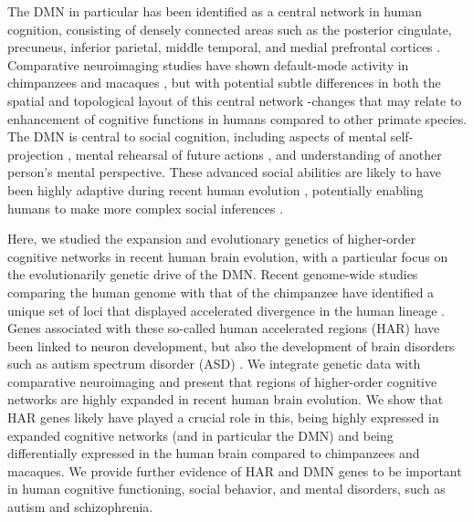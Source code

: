\begin{refsection}
The DMN in particular has been identified as a central network in human cognition, consisting of densely connected areas such as the posterior cingulate, precuneus, inferior parietal, middle temporal, and medial prefrontal cortices \citep{buckner2008brain,raichle2015brain}. Comparative neuroimaging studies have shown default-mode activity in chimpanzees \citep{barks2013default} and macaques \citep{mantini2011default}, but with potential subtle differences in both the spatial and topological layout of this central network \citep{miranda2014bridging}-changes that may relate to enhancement of cognitive functions in humans compared to other primate species. The DMN is central to social cognition, including aspects of mental self-projection \citep{buckner2007self}, mental rehearsal of future actions \citep{tulving2005episodic}, and understanding of another person’s mental perspective. These advanced social abilities are likely to have been highly adaptive during recent human evolution \citep{tomasello2010ape}, potentially enabling humans to make more complex social inferences \citep{buckner2007self}.

Here, we studied the expansion and evolutionary genetics of higher-order cognitive networks in recent human brain evolution, with a particular focus on the evolutionarily genetic drive of the DMN. Recent genome-wide studies comparing the human genome with that of the chimpanzee have identified a unique set of loci that displayed accelerated divergence in the human lineage \citep{pollard2006rna,pollard2006forces}. Genes associated with these so-called human accelerated regions (HAR) have been linked to neuron development, but also the development of brain disorders such as autism spectrum disorder (ASD) \citep{doan2016mutations}. We integrate genetic data with comparative neuroimaging and present that regions of higher-order cognitive networks are highly expanded in recent human brain evolution. We show that HAR genes likely have played a crucial role in this, being highly expressed in expanded cognitive networks (and in particular the DMN) and being differentially expressed in the human brain compared to chimpanzees and macaques. We provide further evidence of HAR and DMN genes to be important in human cognitive functioning, social behavior, and mental disorders, such as autism and schizophrenia.


\end{refsection}
